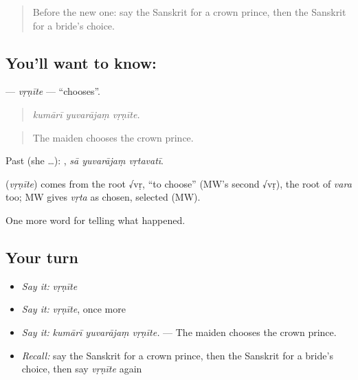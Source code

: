\label{lesson:SA-C339-vrnite}



\begin{quote}
Before the new one: say the Sanskrit for a crown prince, then the Sanskrit for a bride's choice.
\end{quote}

\subsection*{You'll want to know: }
\textbf{} — \emph{vṛṇīte} — \textquotedblleft{}chooses\textquotedblright{}.

\begin{quote}
  
\end{quote}

\begin{quote}
\emph{kumārī yuvarājaṃ vṛṇīte.}
\end{quote}

\begin{quote}
The maiden chooses the crown prince.
\end{quote}

Past (she …):   , \emph{sā yuvarājaṃ vṛtavatī}.

\begin{cousinweb}
\textbf{} (\emph{vṛṇīte}) comes from the root √vṛ, \textquotedblleft{}to choose\textquotedblright{} (MW's second √vṛ), the root of \emph{vara} too; MW gives \emph{vṛta} as chosen, selected (MW).
\end{cousinweb}

\begin{grammarlens}[title={What you've built}]
One more word for telling what happened.
\end{grammarlens}

\subsection*{Your turn}
\begin{itemize}
\raggedright
  \item \emph{Say it:} \emph{vṛṇīte}
  \item \emph{Say it:} \emph{vṛṇīte}, once more
  \item \emph{Say it:} \emph{kumārī yuvarājaṃ vṛṇīte.} — The maiden chooses the crown prince.
  \item \emph{Recall:} say the Sanskrit for a crown prince, then the Sanskrit for a bride's choice, then say \emph{vṛṇīte} again
\end{itemize}

